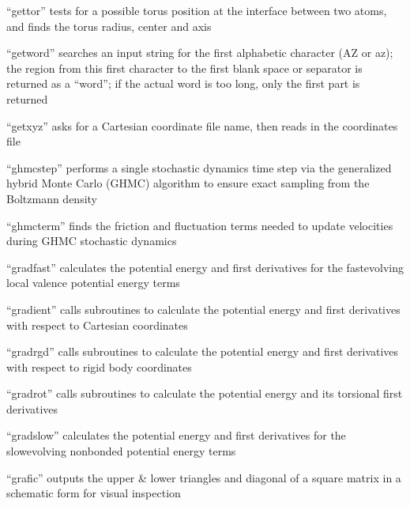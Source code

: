 \documentclass[letterpaper,11pt,english]{sphinxmanual}
\begin{document}
“gettor” tests for a possible torus position at the interface
between two atoms, and finds the torus radius, center and axis


“getword” searches an input string for the first alphabetic
character (A\sphinxhyphen{}Z or a\sphinxhyphen{}z); the region from this first character
to the first blank space or separator is returned as a “word”;
if the actual word is too long, only the first part is returned


“getxyz” asks for a Cartesian coordinate file name,
then reads in the coordinates file


“ghmcstep” performs a single stochastic dynamics time step via
the generalized hybrid Monte Carlo (GHMC) algorithm to ensure
exact sampling from the Boltzmann density


“ghmcterm” finds the friction and fluctuation terms needed
to update velocities during GHMC stochastic dynamics


“gradfast” calculates the potential energy and first derivatives
for the fast\sphinxhyphen{}evolving local valence potential energy terms


“gradient” calls subroutines to calculate the potential energy
and first derivatives with respect to Cartesian coordinates


“gradrgd” calls subroutines to calculate the potential energy
and first derivatives with respect to rigid body coordinates


“gradrot” calls subroutines to calculate the potential
energy and its torsional first derivatives


“gradslow” calculates the potential energy and first derivatives
for the slow\sphinxhyphen{}evolving nonbonded potential energy terms


“grafic” outputs the upper \& lower triangles and diagonal
of a square matrix in a schematic form for visual inspection
\end{document}
